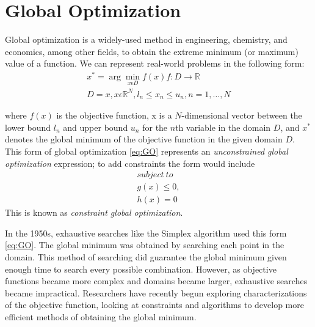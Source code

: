 \chapter{Global Optimization}
\label{background}
Global optimization is a widely-used method in engineering, chemistry, and economics, among other fields, to obtain the extreme minimum (or maximum) value of a function. We can represent real-world problems in the following form:
\label{eq:GO}
  \begin{align}
  x^* = \arg \min_{x \epsilon D} f(x) 
  f:D\rightarrow \mathbb{R} \\ 
  D = {x,x\epsilon \mathbb{R}^{N},l_n\leq x_n \leq u_n, n = 1,\ldots,N} 
  \end{align}

where $f(x)$ is the objective function, x is a $N$-dimensional vector between the lower bound $l_n$ and upper bound $u_n$ for the $n$th variable in the domain $D$, and $x^*$ denotes the global minimum of the objective function in the given domain $D$. This form of global optimization \eqref{eq:GO} represents an \textit{unconstrained global optimization} expression; to add constraints the form would include 
\begin{align}
  \label{eq:constrainedGO}
  subject\ to \nonumber \\
    g(x) \leq 0, \\ 
    h(x) = 0 \nonumber
\end{align}
This is known as \textit{constraint global optimization}.

In the 1950s, exhaustive searches like the Simplex algorithm \cite{Liberti2000} used this form \eqref{eq:GO}. The global minimum was obtained by searching each point in the domain. This method of searching did guarantee the global minimum given enough time to search every possible combination. However, as objective functions became more complex and domains became larger, exhaustive searches became impractical. Researchers have recently begun exploring characterizations of the objective function, looking at constraints and algorithms to develop more efficient methods of obtaining the global minimum. 

 
